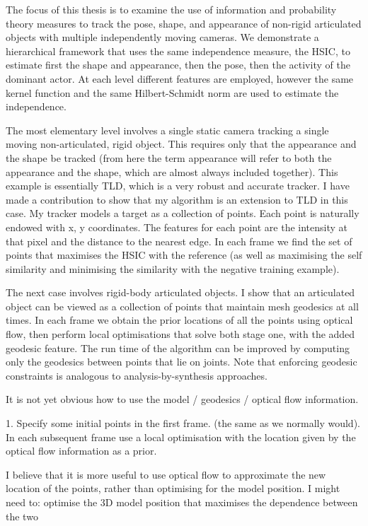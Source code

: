The focus of this thesis is to examine the use of information and probability theory measures to track the pose, shape, and appearance of non-rigid articulated objects with multiple independently moving cameras. We demonstrate a hierarchical framework that uses the same independence measure, the HSIC, to estimate first the shape and appearance, then the pose, then the activity of the dominant actor. At each level different features are employed, however the same kernel function and the same Hilbert-Schmidt norm are used to estimate the independence. 

The most elementary level involves a single static camera tracking a single moving non-articulated, rigid object. This requires only that the appearance and the shape be tracked (from here the term appearance will refer to both the appearance and the shape, which are almost always included together). This example is essentially TLD, which is a very robust and accurate tracker. I have made a contribution to show that my algorithm is an extension to TLD in this case. My tracker models a target as a collection of points. Each point is naturally endowed with x, y coordinates. The features for each point are the intensity at that pixel and the distance to the nearest edge. In each frame we find the set of points that maximises the HSIC with the reference (as well as maximising the self similarity and minimising the similarity with the negative training example).

The next case involves rigid-body articulated objects. I show that an articulated object can be viewed as a collection of points that maintain mesh geodesics at all times. In each frame we obtain the prior locations of all the points using optical flow, then perform local optimisations that solve both stage one, with the added geodesic feature. The run time of the algorithm can be improved by computing only the geodesics between points that lie on joints. Note that enforcing geodesic constraints is analogous to analysis-by-synthesis approaches. 

It is not yet obvious how to use the model / geodesics / optical flow information. 

1. Specify some initial points in the first frame. (the same as we normally would). In each subsequent frame use a local optimisation with the location given by the optical flow information as a prior. 


I believe that it is more useful to use optical flow to approximate the new location of the points, rather than optimising for the model position. I might need to: optimise the 3D model position that maximises the dependence between the two 

